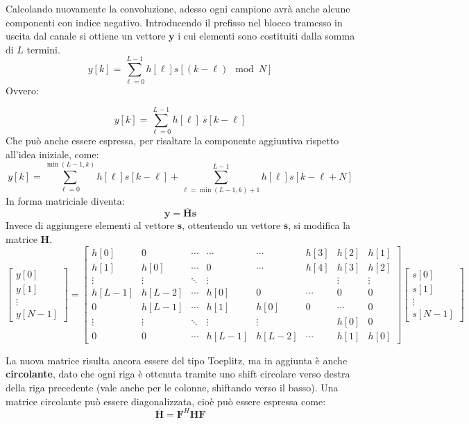 Calcolando nuovamente la convoluzione, adesso ogni campione avrà anche alcune componenti con indice negativo.
Introducendo il prefisso nel blocco tramesso in uscita dal canale si ottiene un vettore $\mathbf{y}$ i cui elementi sono costituiti dalla somma di $L$ termini.
\[
y[k] = \sum_{\ell=0}^{L-1} h[\ell] s[(k-\ell) \mod N]
\]
Ovvero:

\[
    y[k] = \sum_{\ell=0}^{L-1} h[\ell] \ \overline{s}[k-\ell]
\]
Che può anche essere espressa, per risaltare la componente aggiuntiva rispetto all'idea iniziale, come:
\[
y[k] = \sum_{\ell=0}^{\min(L-1, k)} h[\ell] s[k-\ell] + \sum_{\ell=\min(L-1, k)+1}^{L-1} h[\ell] s[k-\ell + N]
\]
In forma matriciale diventa:
\[
    \mathbf{y} = \mathbf{\overline{H}} \mathbf{s}
\]
Invece di aggiungere elementi al vettore $\mathbf{s}$, ottentendo un vettore $\mathbf{\overline{s}}$, si modifica la matrice $\mathbf{H}$.
\[ 
\begin{bmatrix} y[0] \\ y[1] \\ \vdots \\ y[N-1] \end{bmatrix} 
= 
\begin{bmatrix}
    h[0] & 0 & \cdots & \cdots & \cdots & h[3] & h[2] & h[1] \\
    h[1] & h[0] & \cdots & 0 & \cdots & h[4] & h[3] & h[2] \\
    \vdots & \vdots & \ddots & \vdots & &  & \vdots & \vdots \\
    h[L-1] & h[L-2] & \cdots & h[0] & 0 & \cdots & 0 & 0 \\
    0 & h[L-1] & \cdots & h[1] & h[0] & 0 & \cdots & 0 \\
    \vdots & \vdots & \ddots & \vdots & \vdots & & h[0] & 0 \\
    0 & 0 & \cdots & h[L-1] & h[L-2] & \cdots & h[1] & h[0]
\end{bmatrix}   
\begin{bmatrix} s[0] \\ s[1] \\ \vdots \\ s[N-1] \end{bmatrix}
\]



La nuova matrice risulta ancora essere del tipo Toeplitz, ma in aggiunta è anche \textbf{circolante}, dato che ogni riga è ottenuta tramite uno shift circolare verso destra della riga precedente (vale anche per le colonne, shiftando verso il basso).
Una matrice circolante può essere diagonalizzata, cioè può essere espressa come:
\[
    \overline{\mathbf{H}} = \mathbf{F}^H \mathbf{H} \mathbf{F}
\]





